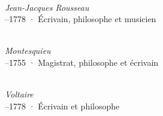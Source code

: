 \noindent\begin{minipage}[t][\textheight][s]{\textwidth}

  \vspace*{\fill}

  \begin{center}

  \begin{minipage}[t]{0.32\textwidth}
    \centering
    \\
    {\figcaptionname\itshape Jean-Jacques Rousseau}\\
    {--1778 · Écrivain, philosophe et musicien}
  \end{minipage}
  \hfill
  \begin{minipage}[t]{0.32\textwidth}
    \centering
    \\
    {\figcaptionname\itshape Montesquieu}\\
    {--1755 · Magistrat, philosophe et écrivain}
  \end{minipage}
  \hfill
  \begin{minipage}[t]{0.32\textwidth}
    \centering
    \\
    {\figcaptionname\itshape Voltaire }\\
    {--1778 · Écrivain et philosophe}
  \end{minipage}

\end{center}

\vspace{2\baselineskip}

\begin{center}



\end{center}
\end{minipage}
